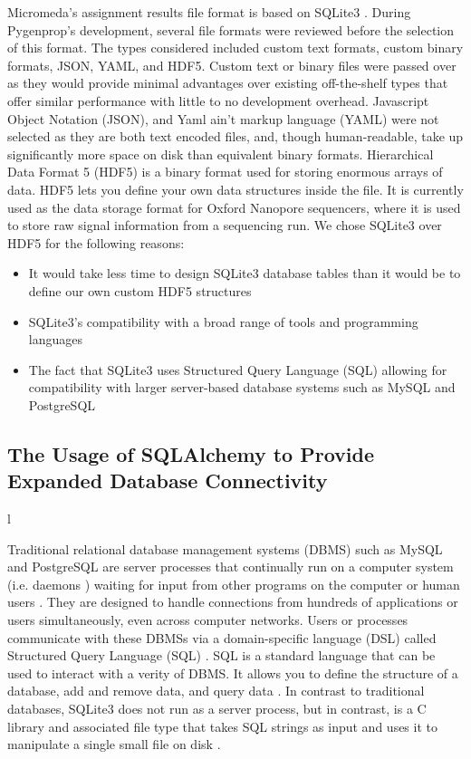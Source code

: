 Micromeda's assignment results file format is based on SQLite3 \cite{owens2006definitive}. During Pygenprop's development, several file formats were reviewed before the selection of this format. The types considered included custom text formats, custom binary formats, JSON, YAML, and HDF5. Custom text or binary files were passed over as they would provide minimal advantages over existing off-the-shelf types that offer similar performance with little to no development overhead. Javascript Object Notation (JSON), and Yaml ain't markup language (YAML) \cite{ben2005yaml} were not selected as they are both text encoded files, and, though human-readable, take up significantly more space on disk than equivalent binary formats. Hierarchical Data Format 5 (HDF5) \cite{folk2011overview} is a binary format used for storing enormous arrays of data. HDF5 lets you define your own data structures inside the file. It is currently used as the data storage format for Oxford Nanopore sequencers, where it is used to store raw signal information from a sequencing run. We chose SQLite3 over HDF5 for the following reasons:
\begin{itemize}
\item It would take less time to design SQLite3 database tables than it would be to define our own custom HDF5 structures
\item SQLite3's compatibility with a broad range of tools and programming languages
\item The fact that SQLite3 uses Structured Query Language (SQL) allowing for compatibility with larger server-based database systems such as MySQL \cite{dubois1999mysql} and PostgreSQL \cite{momjian2001postgresql, owens2006definitive}
\end{itemize}

\subsection{The Usage of SQLAlchemy to Provide Expanded Database Connectivity} \label{SQLAlchemy}l

Traditional relational database management systems (DBMS) such as MySQL and PostgreSQL are server processes that continually run on a computer system (i.e. daemons \cite{martin2006computer}) waiting for input from other programs on the computer or human users \cite{dubois1999mysql, momjian2001postgresql}. They are designed to handle connections from hundreds of applications or users simultaneously, even across computer networks. Users or processes communicate with these DBMSs via a domain-specific language (DSL) called Structured Query Language (SQL) \cite{sql1987guide}. SQL is a standard language that can be used to interact with a verity of DBMS. It allows you to define the structure of a database, add and remove data, and query data \cite{sql1987guide}. In contrast to traditional databases, SQLite3 does not run as a server process, but in contrast, is a C library and associated file type that takes SQL strings as input and uses it to manipulate a single small file on disk \cite{owens2006definitive}.

